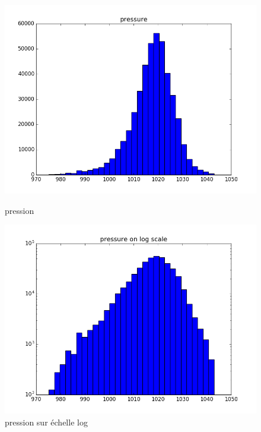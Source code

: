 \begin{figure}[H]
\captionsetup{labelformat=empty}
  \includegraphics[width=\linewidth]{images/pression.png}
  \caption{pression}
\endminipage\hfill
{}
  \includegraphics[width=\linewidth]{images/log_pression.png}
  \caption{pression sur échelle log}
\endminipage\hfill
\end{figure}

